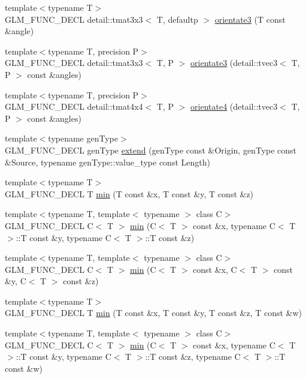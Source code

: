 \begin{CompactItemize}
\item 
{\footnotesize template$<$typename T$>$ }\\GLM\_\-FUNC\_\-DECL detail::tmat3x3$<$ T, defaultp $>$ \hyperlink{group__gtx__euler__angles_gce794db535af3056d97f4f62e7ed7509}{orientate3} (T const \&angle)
\item 
{\footnotesize template$<$typename T, precision P$>$ }\\GLM\_\-FUNC\_\-DECL detail::tmat3x3$<$ T, P $>$ \hyperlink{group__gtx__euler__angles_g114ce533cc2f140cb17ca5a44214d973}{orientate3} (detail::tvec3$<$ T, P $>$ const \&angles)
\item 
{\footnotesize template$<$typename T, precision P$>$ }\\GLM\_\-FUNC\_\-DECL detail::tmat4x4$<$ T, P $>$ \hyperlink{group__gtx__euler__angles_g98f6c8d3b6b97ff0ae2f64544142cb7f}{orientate4} (detail::tvec3$<$ T, P $>$ const \&angles)
\item 
{\footnotesize template$<$typename genType$>$ }\\GLM\_\-FUNC\_\-DECL genType \hyperlink{group__gtx__extend_g58f71cd2eec18e104f500a437ed9dd7d}{extend} (genType const \&Origin, genType const \&Source, typename genType::value\_\-type const Length)
\item 
{\footnotesize template$<$typename T$>$ }\\GLM\_\-FUNC\_\-DECL T \hyperlink{group__gtx__extented__min__max_gff0ad3009c15ec132717c7150dd96803}{min} (T const \&x, T const \&y, T const \&z)
\item 
{\footnotesize template$<$typename T, template$<$ typename $>$ class C$>$ }\\GLM\_\-FUNC\_\-DECL C$<$ T $>$ \hyperlink{group__gtx__extented__min__max_gd88885e3f9bbaeab162e9ea22db68858}{min} (C$<$ T $>$ const \&x, typename C$<$ T $>$::T const \&y, typename C$<$ T $>$::T const \&z)
\item 
{\footnotesize template$<$typename T, template$<$ typename $>$ class C$>$ }\\GLM\_\-FUNC\_\-DECL C$<$ T $>$ \hyperlink{group__gtx__extented__min__max_g50d031fb07c48e0626d12bf891df996d}{min} (C$<$ T $>$ const \&x, C$<$ T $>$ const \&y, C$<$ T $>$ const \&z)
\item 
{\footnotesize template$<$typename T$>$ }\\GLM\_\-FUNC\_\-DECL T \hyperlink{group__gtx__extented__min__max_gdb4c9ecc8ca939f43ba21f8f13a2ad5b}{min} (T const \&x, T const \&y, T const \&z, T const \&w)
\item 
{\footnotesize template$<$typename T, template$<$ typename $>$ class C$>$ }\\GLM\_\-FUNC\_\-DECL C$<$ T $>$ \hyperlink{group__gtx__extented__min__max_g8c81655ede8d78e3c7d8294cdef3f483}{min} (C$<$ T $>$ const \&x, typename C$<$ T $>$::T const \&y, typename C$<$ T $>$::T const \&z, typename C$<$ T $>$::T const \&w)

\end{CompactItemize}
